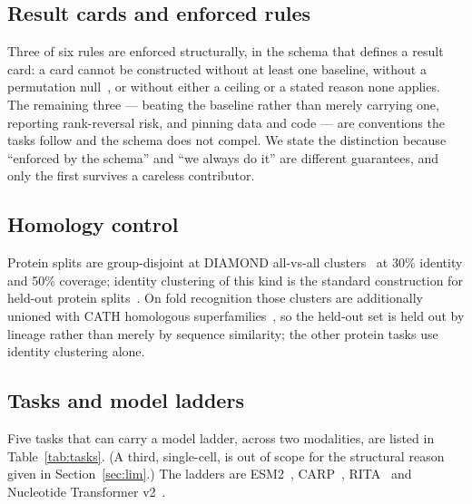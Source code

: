 \documentclass[11pt]{article}
\begin{document}
\subsection{Result cards and enforced rules}

Three of six rules are enforced structurally, in the schema that defines a
result card: a card cannot be constructed without at
least one baseline, without a permutation null~\citep{ojala2009permutation}, or without either a ceiling or a
stated reason none applies. The remaining three --- beating the baseline rather than
merely carrying one, reporting rank-reversal risk, and pinning data and code ---
are conventions the tasks follow and the schema does not compel. We state the
distinction because ``enforced by the schema'' and ``we always do it'' are
different guarantees, and only the first survives a careless contributor.

\subsection{Homology control}

Protein splits are group-disjoint at DIAMOND
all-vs-all clusters~\citep{buchfink2015diamond} at 30\% identity and 50\%
coverage; identity clustering of this kind is the standard construction for
held-out protein splits~\citep{steinegger2017mmseqs2}. On fold recognition those
clusters are additionally unioned with CATH
homologous superfamilies~\citep{sillitoe2021cath}, so the held-out set is held out
by lineage rather than merely by sequence similarity; the other protein tasks use
identity clustering alone.

\subsection{Tasks and model ladders}

Five tasks that can carry a model ladder, across two modalities, are listed in
Table~\ref{tab:tasks}. (A third,
single-cell, is out of scope for the structural reason given in
Section~\ref{sec:lim}.) The ladders are ESM2~\citep{lin2023esm2},
CARP~\citep{yang2024carp}, RITA~\citep{hesslow2022rita} and Nucleotide
Transformer v2~\citep{dallatorre2024nt}.
\end{document}

